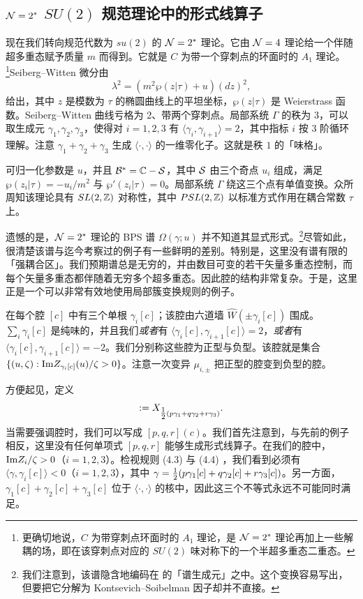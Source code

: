 \subsection{$\mathcal{N}=2^*$ $SU(2)$ 规范理论中的形式线算子}
\label{subsec:Formal-N2-star}

现在我们转向规范代数为 $su(2)$ 的 $\mathcal{N}=2^*$ 理论。它由 $\mathcal{N}=4$ 理论给一个伴随超多重态赋予质量 $m$ 而得到。它就是 $C$ 为带一个穿刺点的环面时的 $A_1$ 理论。\footnote{更确切地说，$C$ 为带穿刺点环面时的 $A_1$ 理论，是 $\mathcal{N}=2^*$ 理论再加上一些解耦的场，即在该穿刺点对应的 $SU(2)$ 味对称下的一个半超多重态二重态。}Seiberg--Witten 微分由
%
\begin{equation}
\lambda^2 = \left( m^2 \wp(z\vert \tau) + u\right) (dz)^2,
\end{equation}
%
给出，其中 $z$ 是模数为 $\tau$ 的椭圆曲线上的平坦坐标，$\wp(z\vert \tau)$ 是 Weierstrass 函数。Seiberg--Witten 曲线亏格为 2、带两个穿刺点。局部系统 $\Gamma$ 的秩为 $3$，可以取生成元 $\gamma_1, \gamma_2, \gamma_3$，使得对 $i=1,2,3$ 有 $\langle \gamma_i, \gamma_{i+1} \rangle =2$，其中指标 $i$ 按 $3$ 阶循环理解。注意 $\gamma_1 + \gamma_2 + \gamma_3$ 生成 $\langle \cdot, \cdot \rangle$ 的一维零化子。这就是秩 $1$ 的「味格」。

可归一化参数是 $u$，并且 $\mathcal{B}^* = \mathbb{C}-\mathcal{S}$，其中 $\mathcal{S}$ 由三个奇点 $u_i$ 组成，满足 $\wp(z_i\vert \tau) = - u_i/m^2$ 与 $\wp'(z_i\vert\tau) =0$。局部系统 $\Gamma$ 绕这三个点有单值变换。众所周知该理论具有 $SL(2,\mathbb{Z})$ 对称性，其中 $PSL(2,\mathbb{Z})$ 以标准方式作用在耦合常数 $\tau$ 上。

遗憾的是，$\mathcal{N}=2^*$ 理论的 BPS 谱 $\Omega(\gamma;u)$ 并不知道其显式形式。\footnote{我们注意到，该谱隐含地编码在 \cite{Gaiotto:2009hg} 的「谱生成元」之中。这个变换容易写出，但要把它分解为 Kontsevich--Soibelman 因子却并不直接。}尽管如此，很清楚该谱与迄今考察过的例子有一些鲜明的差别。特别是，这里没有谱有限的「强耦合区」。我们预期谱总是无穷的，并由数目可变的若干矢量多重态控制，而每个矢量多重态都伴随着无穷多个超多重态。因此腔的结构非常复杂。于是，这里正是一个可以非常有效地使用局部簇变换规则的例子。

在每个腔 $[c]$ 中有三个单根 $\gamma_i[c]$；该腔由六道墙 $\widehat{W}(\pm \gamma_i[c])$ 围成。$\sum_i \gamma_i[c]$ 是纯味的，并且我们\emph{或者}有 $\langle \gamma_i[c],\gamma_{i+1}[c]\rangle=2$，\emph{或者}有 $\langle \gamma_i[c],\gamma_{i+1}[c]\rangle=-2$。我们分别称这些腔为正型与负型。该腔就是集合 $\{ (u,\zeta): {\rm Im}Z_{\gamma_i[c]}(u)/\zeta > 0 \}$。注意一次变异 $\mu_{i,\pm}$ 把正型的腔变到负型的腔。

方便起见，定义
%
\begin{equation}
[p,q,r]:= X_{\half (p \gamma_1 + q \gamma_2 + r \gamma_3)}.
\end{equation}
%
当需要强调腔时，我们可以写成 $[p,q,r](c)$。我们首先注意到，与先前的例子相反，这里没有任何单项式 $[p,q,r]$ 能够生成形式线算子。在我们的腔中，${\rm Im} Z_i/\zeta >0$（$i=1,2,3$）。检视规则 (4.3)%
与 (4.4)%
，我们看到必须有 $\langle \gamma, \gamma_i[c] \rangle <0$（$i=1,2,3$），其中 $\gamma = \tfrac{1}{2} (p\gamma_1[c]+q\gamma_2[c]+r\gamma_3[c])$。另一方面，$\gamma_1[c]+\gamma_2[c]+\gamma_3[c]$ 位于 $\langle \cdot, \cdot \rangle$ 的核中，因此这三个不等式永远不可能同时满足。


